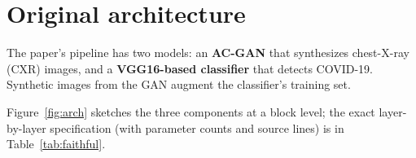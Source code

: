 \documentclass[11pt]{article}
\begin{document}
\tableofcontents
\bigskip

\section{Original architecture}
\label{sec:arch}

The paper's pipeline has two models: an \textbf{AC-GAN} that synthesizes
chest-X-ray (CXR) images, and a \textbf{VGG16-based classifier} that detects
COVID-19. Synthetic images from the GAN augment the classifier's training set.

Figure~\ref{fig:arch} sketches the three components at a block level; the exact
layer-by-layer specification (with parameter counts and source lines) is in
Table~\ref{tab:faithful}.
\end{document}
